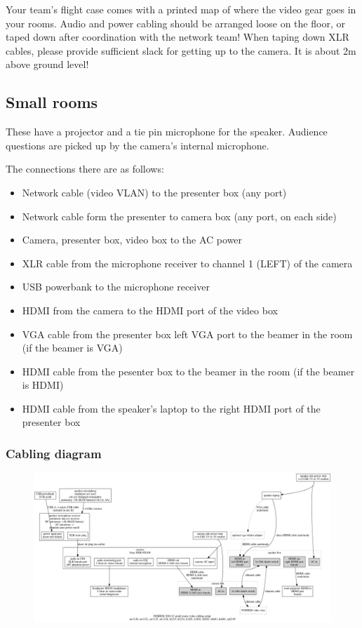 \documentclass{article}
\begin{document}
Your team's flight case comes with a printed map of where the video gear goes in your rooms. Audio and power cabling should be arranged loose on the floor, or taped down after coordination with the network team! When taping down XLR cables, please provide sufficient slack for getting up to the camera. It is about 2m above ground level!

\subsection{Small rooms}
These have a projector and a tie pin microphone for the speaker. Audience questions are picked up by the camera's internal microphone.

The connections there are as follows:

\begin{itemize}
  \item Network cable (video VLAN) to the presenter box (any port)
  \item Network cable form the presenter to camera box (any port, on each side)
  \item Camera, presenter box, video box to the AC power
  \item XLR cable from the microphone receiver to channel 1 (LEFT) of the camera
  \item USB powerbank to the microphone receiver
  \item HDMI from the camera to the HDMI port of the video box
  \item VGA cable from the presenter box left VGA port to the beamer in the room (if the beamer is VGA)
  \item HDMI cable from the pesenter box to the beamer in the room (if the beamer is HDMI)
  \item HDMI cable from the speaker's laptop to the right HDMI port of the presenter box
\end{itemize}
\subsubsection{Cabling diagram}
\begin{figure}[H]
  \begin{sideways}
  \centering
  \includegraphics[width = 200mm]{../../graph/cabling_small_rooms.png}
  \end{sideways}
\end{figure}
\end{document}
